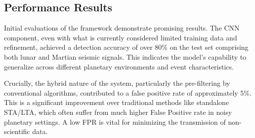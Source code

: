 \documentclass[conference]{IEEEtran}
\begin{document}
        \subsection{Performance Results}
        Initial evaluations of the framework demonstrate promising results. The CNN component, even with what is
        currently considered limited training data and refinement, achieved a detection accuracy of over 80\% on the
        test set comprising both lunar and Martian seismic signals. This indicates the model's capability to generalize
        across different planetary environments and event characteristics.
        
        Crucially, the hybrid nature of the system, particularly the pre-filtering by conventional algorithms,
        contributed to a false positive rate of approximately 5\%. This is a significant improvement over
        traditional methods like standalone STA/LTA, which often suffer from much higher False Positive rate in noisy planetary
        settings. A low FPR is vital for minimizing the transmission of non-scientific data.
        
        
        
\end{document}
